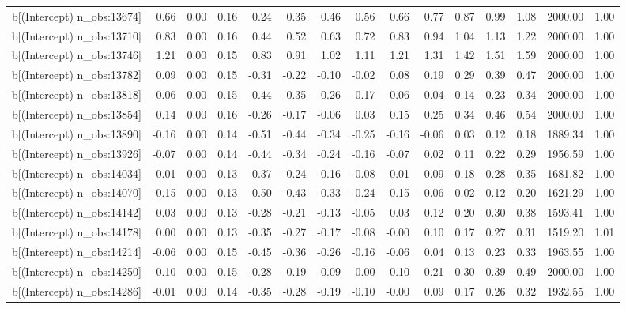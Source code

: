 \begin{table}[ht]
\begin{tabular}{rrrrrrrrrrrrrrr}
  b[(Intercept) n\_obs:13674] & 0.66 & 0.00 & 0.16 & 0.24 & 0.35 & 0.46 & 0.56 & 0.66 & 0.77 & 0.87 & 0.99 & 1.08 & 2000.00 & 1.00 \\ 
  b[(Intercept) n\_obs:13710] & 0.83 & 0.00 & 0.16 & 0.44 & 0.52 & 0.63 & 0.72 & 0.83 & 0.94 & 1.04 & 1.13 & 1.22 & 2000.00 & 1.00 \\ 
  b[(Intercept) n\_obs:13746] & 1.21 & 0.00 & 0.15 & 0.83 & 0.91 & 1.02 & 1.11 & 1.21 & 1.31 & 1.42 & 1.51 & 1.59 & 2000.00 & 1.00 \\ 
  b[(Intercept) n\_obs:13782] & 0.09 & 0.00 & 0.15 & -0.31 & -0.22 & -0.10 & -0.02 & 0.08 & 0.19 & 0.29 & 0.39 & 0.47 & 2000.00 & 1.00 \\ 
  b[(Intercept) n\_obs:13818] & -0.06 & 0.00 & 0.15 & -0.44 & -0.35 & -0.26 & -0.17 & -0.06 & 0.04 & 0.14 & 0.23 & 0.34 & 2000.00 & 1.00 \\ 
  b[(Intercept) n\_obs:13854] & 0.14 & 0.00 & 0.16 & -0.26 & -0.17 & -0.06 & 0.03 & 0.15 & 0.25 & 0.34 & 0.46 & 0.54 & 2000.00 & 1.00 \\ 
  b[(Intercept) n\_obs:13890] & -0.16 & 0.00 & 0.14 & -0.51 & -0.44 & -0.34 & -0.25 & -0.16 & -0.06 & 0.03 & 0.12 & 0.18 & 1889.34 & 1.00 \\ 
  b[(Intercept) n\_obs:13926] & -0.07 & 0.00 & 0.14 & -0.44 & -0.34 & -0.24 & -0.16 & -0.07 & 0.02 & 0.11 & 0.22 & 0.29 & 1956.59 & 1.00 \\ 
  b[(Intercept) n\_obs:14034] & 0.01 & 0.00 & 0.13 & -0.37 & -0.24 & -0.16 & -0.08 & 0.01 & 0.09 & 0.18 & 0.28 & 0.35 & 1681.82 & 1.00 \\ 
  b[(Intercept) n\_obs:14070] & -0.15 & 0.00 & 0.13 & -0.50 & -0.43 & -0.33 & -0.24 & -0.15 & -0.06 & 0.02 & 0.12 & 0.20 & 1621.29 & 1.00 \\ 
  b[(Intercept) n\_obs:14142] & 0.03 & 0.00 & 0.13 & -0.28 & -0.21 & -0.13 & -0.05 & 0.03 & 0.12 & 0.20 & 0.30 & 0.38 & 1593.41 & 1.00 \\ 
  b[(Intercept) n\_obs:14178] & 0.00 & 0.00 & 0.13 & -0.35 & -0.27 & -0.17 & -0.08 & -0.00 & 0.10 & 0.17 & 0.27 & 0.31 & 1519.20 & 1.01 \\ 
  b[(Intercept) n\_obs:14214] & -0.06 & 0.00 & 0.15 & -0.45 & -0.36 & -0.26 & -0.16 & -0.06 & 0.04 & 0.13 & 0.23 & 0.33 & 1963.55 & 1.00 \\ 
  b[(Intercept) n\_obs:14250] & 0.10 & 0.00 & 0.15 & -0.28 & -0.19 & -0.09 & 0.00 & 0.10 & 0.21 & 0.30 & 0.39 & 0.49 & 2000.00 & 1.00 \\ 
  b[(Intercept) n\_obs:14286] & -0.01 & 0.00 & 0.14 & -0.35 & -0.28 & -0.19 & -0.10 & -0.00 & 0.09 & 0.17 & 0.26 & 0.32 & 1932.55 & 1.00 \\ 

\end{tabular}
\end{table}
